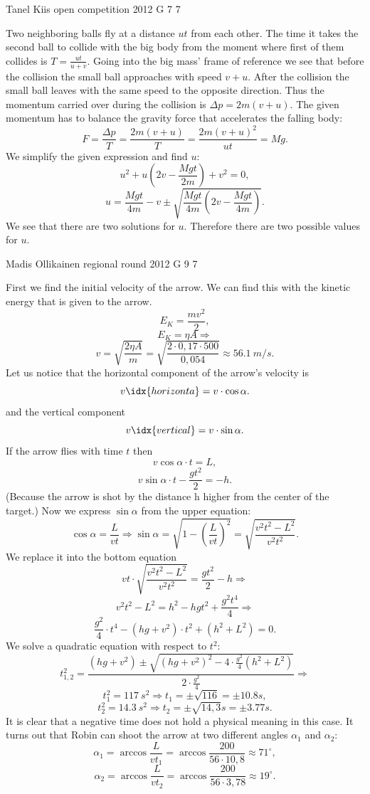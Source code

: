 \documentclass[11pt]{article}
\begin{document}
{Tanel Kiis} %
{open competition} %
{2012} %
{G 7} %
{7} %
{

\ifEngSolution
Two neighboring balls fly at a distance $u t$ from each other. The time it takes the second ball to collide with the big body from the moment where first of them collides is $T=\frac{u t}{u+v}$. Going into the big mass’ frame of reference we see that before the collision the small ball approaches with speed $v + u$. After the collision the small ball leaves with the same speed to the opposite direction. Thus the momentum carried over during the collision is $\Delta p = 2m(v + u)$. The given momentum has to balance the gravity force that accelerates the falling body:
\[ F=\frac{\Delta p}{T}=\frac{2m(v + u)}{T} = \frac{2m(v + u)^2}{ut}=Mg. \] 
We simplify the given expression and find $u$:
\[
u^2 + u\left( 2v - \frac{Mgt}{2m}\right) + v^2 = 0,
\] 
\[
u = \frac{Mgt}{4m} - v \pm \sqrt{\frac{Mgt}{4m}\left( 2v - \frac{Mgt}{4m}\right)}.
\]
We see that there are two solutions for $u$. Therefore there are two possible values for $u$.
\fi
}

{Madis Ollikainen} %
{regional round} %
{2012} %
{G 9} %
{7} %
{

\ifEngSolution
First we find the initial velocity of the arrow. We can find this with the kinetic energy that is given to the arrow.
$$ E_{K}=\frac{m v^2}{2},$$ 
$$E_{K}=\eta A \Rightarrow$$
$$v=\sqrt{\frac{2\eta A}{m}}=\sqrt{\frac{2\cdot0,17\cdot 500}{0,054}}\approx \SI{56,1}{m/s}.$$
Let us notice that the horizontal component of the arrow’s velocity is 
$$v\idx{horizonta}=v\cdot \cos\alpha.$$ 
and the vertical component
$$v\idx{vertical}=v\cdot \sin\alpha.$$ 
If the arrow flies with time $t$ then 
$$v \cos\alpha\cdot t=L,$$ 
$$v \sin\alpha\cdot t-\frac{g t^2}{2}=-h. $$
(Because the arrow is shot by the distance h higher from the center of the target.) 
Now we express $\sin\alpha$ from the upper equation:
$$\cos\alpha=\frac{L}{vt} \Rightarrow \sin\alpha=\sqrt{1-\left(\frac{L}{vt}\right)^2}=\sqrt{\frac{v^2t^2-L^2}{v^2t^2}}.$$ 
We replace it into the bottom equation
$$vt\cdot \sqrt{\frac{v^2t^2-L^2}{v^2t^2}}=\frac{g t^2}{2}-h \Rightarrow$$ 
$$v^2t^2-L^2=h^2 - hgt^2+\frac{g^2 t^4}{4}  \Rightarrow$$
$$\frac{g^2}{4}\cdot t^4 - \left(hg+v^2\right)\cdot t^2 + \left(h^2+L^2\right)=0.$$
We solve a quadratic equation with respect to $t^2$:
$$t^2_{1,2}=\frac{\left(hg+v^2\right)\pm\sqrt{\left(hg+v^2\right)^2-4\cdot \frac{g^2}{4}\left(h^2+L^2\right)}}{2\cdot \frac{g^2}{4}} \Rightarrow$$ 
$$t^2_{1}=\SI{117}{s^2}  \Rightarrow t_{1}=\pm\sqrt{116}=\pm \SI{10,8}s,$$
$$t^2_{2}=\SI{14,3}{s^2} \Rightarrow t_{2}=\pm \sqrt{14,3}\SI{}s=\pm \SI{3,77}s.$$
It is clear that a negative time does not hold a physical meaning in this case. It turns out that Robin can shoot the arrow at two different angles $\alpha_{1}$ and $\alpha_{2}$:
$$\alpha_{1}= \arccos\frac{L}{vt_{1}}=\arccos\frac{200}{56\cdot10,8}\approx 71^\circ ,$$ 
$$\alpha_{2}=\arccos\frac{L}{vt_{2}}=\arccos\frac{200}{56\cdot3,78}\approx 19^\circ .$$
\fi
}
\end{document}
